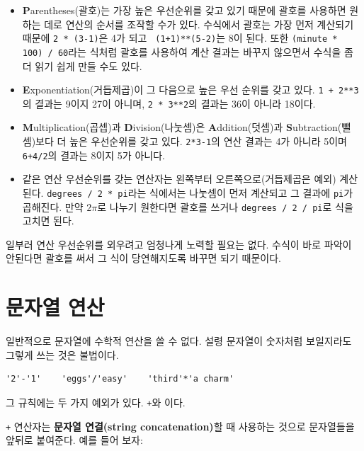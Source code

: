 \documentclass[10pt]{book}
\begin{document}
\begin{itemize}

\item {\bf P}arentheses(괄호)는 가장 높은 우선순위를 갖고 있기 때문에
  괄호를 사용하면 원하는 데로 연산의 순서를 조작할 수가 있다.  수식에서
  괄호는 가장 먼저 계산되기 때문에 {\tt 2 * (3-1)}은 4가 되고 {\tt
    (1+1)**(5-2)}는 8이 된다.  또한 {\tt (minute * 100) / 60}라는
  식처럼 괄호를 사용하여 계산 결과는 바꾸지 않으면서 수식을 좀 더 읽기
  쉽게 만들 수도 있다.

\item {\bf E}xponentiation(거듭제곱)이 그 다음으로 높은 우선 순위를
  갖고 있다.  {\tt 1 + 2**3}의 결과는 9이지 27이 아니며, {\tt 2 *
    3**2}의 결과는 36이 아니라 18이다.


\item {\bf M}ultiplication(곱셉)과 {\bf D}ivision(나눗셈)은 {\bf
    A}ddition(덧셈)과 {\bf S}ubtraction(뺄셈)보다 더 높은 우선순위를
  갖고 있다. {\tt 2*3-1}의 연산 결과는 4가 아니라 5이며 {\tt 6+4/2}의
  결과는 8이지 5가 아니다.


\item 같은 연산 우선순위를 갖는 연산자는 왼쪽부터 오른쪽으로(거듭제곱은 예외) 계산된다. 
{\tt degrees / 2 * pi}라는 식에서는 나눗셈이 먼저 계산되고 그 결과에 {\tt pi}가 곱해진다.  만약 $2 \pi$로 나누기 원한다면 괄호를 쓰거나 {\tt degrees / 2 / pi}로 식을 고치면 된다.

\end{itemize}


일부러 연산 우선순위를 외우려고 엄청나게 노력할 필요는 없다.  수식이
바로 파악이 안된다면 괄호를 써서 그 식이 당연해지도록 바꾸면 되기 때문이다.


\section{문자열 연산}


일반적으로 문자열에 수학적 연산을 쓸 수 없다.  설령 문자열이 숫자처럼
보일지라도 그렇게 쓰는 것은 불법이다.


\begin{verbatim}
'2'-'1'    'eggs'/'easy'    'third'*'a charm'
\end{verbatim}
%
그 규칙에는 두 가지 예외가 있다. {\tt +}와 {\tt *}이다. 


{\tt +} 연산자는 {\bf 문자열 연결(string concatenation)}할 때 사용하는
것으로 문자열들을 앞뒤로 붙여준다. 예를 들어 보자:
\end{document}
